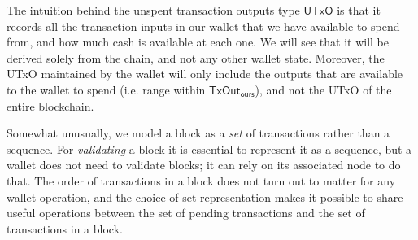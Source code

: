 \documentclass{article}
\theoremstyle{definition}{
  \newtheorem{lemma}{Lemma}[section] %
  \newtheorem{definition}[lemma]{Definition}
}
\theoremstyle{theorem}{
  \newtheorem{invariant}[lemma]{Invariant}
  \newtheorem{proofobligation}[lemma]{Proof Obligation}
}
\numberwithin{equation}{lemma}
\begin{document}
The intuition behind the unspent transaction outputs type $\mathsf{UTxO}$ is
that it records all the transaction inputs in our wallet that we have available
to spend from, and how much cash is available at each one. We will see that it
will be derived solely from the chain, and not any other wallet state. Moreover,
the UTxO maintained by the wallet will only include the outputs that are
available to the wallet to spend (i.e. range within $\mathsf{TxOut_{ours}}$),
and not the UTxO of the entire blockchain.

Somewhat unusually, we model a block as a \emph{set} of transactions rather than
a sequence. For \emph{validating} a block it is essential to represent it as a
sequence, but a wallet does not need to validate blocks; it can rely on its
associated node to do that. The order of transactions in a block does not turn
out to matter for any wallet operation, and the choice of set representation
makes it possible to share useful operations between the set of pending
transactions and the set of transactions in a block.
\end{document}
